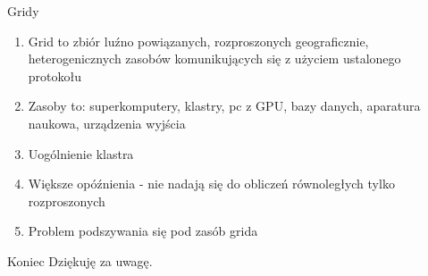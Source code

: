 \documentclass{beamer}
\begin{document}
\begin{frame}{Gridy}
  \begin{enumerate}
  \item Grid to zbiór luźno powiązanych, rozproszonych geograficznie, heterogenicznych zasobów komunikujących się z użyciem ustalonego protokołu
  \item Zasoby to: superkomputery, klastry, pc z GPU, bazy danych, aparatura naukowa, urządzenia wyjścia
  \item Uogólnienie klastra
  \item Większe opóźnienia - nie nadają się do obliczeń równoległych tylko rozproszonych
  \item Problem podszywania się pod zasób grida
  \end{enumerate}
\end{frame}

\begin{frame}{Koniec}
Dziękuję za uwagę.
\end{frame}
\end{document}
